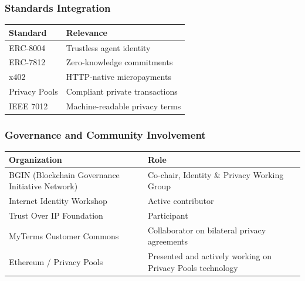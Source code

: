 \documentclass[
]{article}
\newcounter{none} %
\begin{document}
\subsubsection{Standards Integration}\label{standards-integration}

{\def\LTcaptype{none} %
\begin{longtable}[]{@{}ll@{}}
\toprule\noalign{}
Standard & Relevance \\
\midrule\noalign{}
\endhead
\bottomrule\noalign{}
\endlastfoot
ERC-8004 & Trustless agent identity \\
ERC-7812 & Zero-knowledge commitments \\
x402 & HTTP-native micropayments \\
Privacy Pools & Compliant private transactions \\
IEEE 7012 & Machine-readable privacy terms \\
\end{longtable}
}

\subsubsection{Governance and Community
Involvement}\label{governance-and-community-involvement}

{\def\LTcaptype{none} %
\begin{longtable}[]{@{}
  >{\raggedright\arraybackslash}p{}
  >{\raggedright\arraybackslash}p{}@{}}
\toprule\noalign{}
\begin{minipage}[b]{\linewidth}\raggedright
Organization
\end{minipage} & \begin{minipage}[b]{\linewidth}\raggedright
Role
\end{minipage} \\
\midrule\noalign{}
\endhead
\bottomrule\noalign{}
\endlastfoot
BGIN (Blockchain Governance Initiative Network) & Co-chair, Identity \&
Privacy Working Group \\
Internet Identity Workshop & Active contributor \\
Trust Over IP Foundation & Participant \\
MyTerms Customer Commons & Collaborator on bilateral privacy
agreements \\
Ethereum / Privacy Pools & Presented and actively working on Privacy
Pools technology \\
\end{longtable}
}
\end{document}
